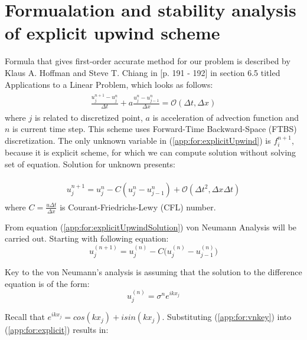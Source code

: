 \section{Formualation and stability analysis of explicit upwind scheme}
	Formula that gives first-order accurate method for our problem is described by Klaus A. Hoffman and Steve T. Chiang in \cite{bib:hoffman}[p. 191 - 192] in section 6.5 titled Applications to a Linear Problem, which looks as follows:
		\begin{align}
			\label{app:for:explicitUpwind}
			\begin{split}
				\frac{u_j^{n+1} - u_j^n}{\Delta t} + a\frac{u_j^n - u_{j-1}^n}{\Delta x} = \mathcal{O}(\Delta t, \Delta x)
			\end{split}
		\end{align}
	where $j$ is related to discretized point, $a$ is acceleration of advection function and $n$ is current time step. This scheme uses Forward-Time Backward-Space (FTBS) discretization.
	The only unknown variable in (\ref{app:for:explicitUpwind}) is $f_i^{n+1}$, because it is explicit scheme, for which we can compute solution without solving set of equation. Solution for unknown presents:
	
		\begin{align}
			\label{app:for:explicitUpwindSolution}
			\begin{split}
				u_j^{n+1} = u_j^n - C(u_j^n - u_{j-1}^n) + \mathcal{O}(\Delta t^2, \Delta x \Delta t)
			\end{split}			
		\end{align}
	where $C=\frac{u\Delta t}{\Delta x}$ is Courant-Friedrichs-Lewy (CFL) number.
	
	From equation (\ref{app:for:explicitUpwindSolution}) von Neumann Analysis will be carried out. Starting with following equation:
	\begin{equation}
		\label{app:for:explicit}
		u_j^{(n+1)} = u_j^{(n)} - C\Big(u_j^{(n)} - u_{j-1}^{(n)}\Big)
	\end{equation}
	
	Key to the von Neumann's analysis is assuming that the solution to the difference equation is of the form:
	\begin{equation}
		\label{app:for:vnkey}
		u_j^{(n)} = \sigma^ne^{ikx_j}
	\end{equation}
	
	Recall that $e^{ikx_j} = cos(kx_j) + isin(kx_j)$. Substituting (\ref{app:for:vnkey}) into (\ref{app:for:explicit}) results in:
	
